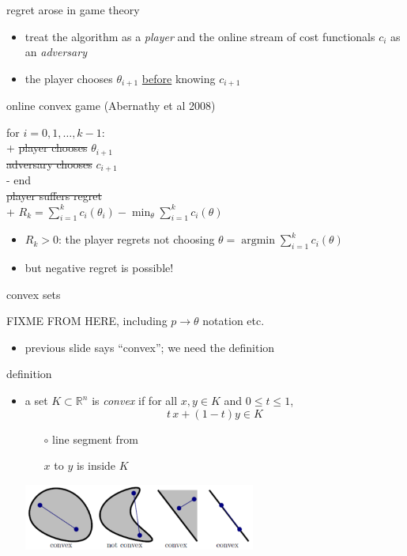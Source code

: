 \documentclass[xcolor={svgnames},
               hyperref={colorlinks,citecolor=DeepPink4,linkcolor=FireBrick,urlcolor=Maroon}]
               {beamer}
\newcommand{\argmin}{\operatorname{argmin}}
\newcommand{\RR}{\mathbb{R}}
\newcommand{\ds}{\displaystyle}
\begin{document}
\begin{frame}{regret arose in game theory}

\begin{itemize}
\item treat the algorithm as a \emph{player} and the online stream of cost functionals $c_i$ as an \emph{adversary}
\item the player chooses $\theta_{i+1}$ \underline{before} knowing $c_{i+1}$
\end{itemize}

\begin{block}{online convex game (Abernathy et al 2008)}
\begin{pseudo*}
for $i = 0,1,\dots,k-1$: \\+
    \st{player chooses} $\theta_{i+1}$ \\
    \st{adversary chooses} $c_{i+1}$ \\-
end \\
\st{player suffers regret} \\+
    $\ds R_k = \sum_{i=1}^k c_i(\theta_i) - \min_\theta \sum_{i=1}^k c_i(\theta)$
\end{pseudo*}
\end{block}

\begin{itemize}
\item $R_k>0$: the player regrets not choosing $\theta = \argmin \sum_{i=1}^k c_i(\theta)$
\item but negative regret is possible!
\end{itemize}
\end{frame}


\begin{frame}{convex sets}

FIXME FROM HERE, including $p\to\theta$ notation etc.

\begin{itemize}
\item previous slide says ``convex''; we need the definition
\end{itemize}

\begin{block}{definition}
\begin{itemize}
\item a set $K \subset \RR^n$ is \emph{convex} if for all $x,y \in K$ and $0 \le t \le 1$,
  $$t\, x + (1-t) y \in K$$

    \begin{itemize}
    \item[$\circ$] line segment from
    \item[]  $x$ to $y$ is inside $K$
    \end{itemize}

\vspace{-8mm}
\hfill \includegraphics[width=0.6\textwidth]{figs/convex}
\end{itemize}
\end{block}
\end{frame}
\end{document}
